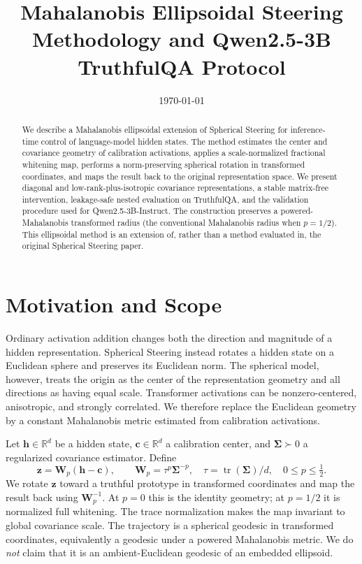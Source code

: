 \documentclass[11pt]{article}
\title{Mahalanobis Ellipsoidal Steering\\
\large Methodology and Qwen2.5-3B TruthfulQA Protocol}
\author{}
\date{\today}
\newcommand{\R}{\mathbb{R}}
\begin{document}
\maketitle

\begin{abstract}
We describe a Mahalanobis ellipsoidal extension of Spherical Steering for
inference-time control of language-model hidden states.  The method estimates
the center and covariance geometry of calibration activations, applies a
scale-normalized fractional whitening map, performs a norm-preserving
spherical rotation in transformed coordinates, and maps the result back to
the original representation space. We present
diagonal and low-rank-plus-isotropic covariance representations, a stable
matrix-free intervention, leakage-safe nested evaluation on TruthfulQA, and
the validation procedure used for Qwen2.5-3B-Instruct. The construction
preserves a powered-Mahalanobis transformed radius (the conventional
Mahalanobis radius when $p=1/2$). This ellipsoidal method
is an extension of, rather than a method evaluated in, the original Spherical
Steering paper.
\end{abstract}

\section{Motivation and Scope}

Ordinary activation addition changes both the direction and magnitude of a
hidden representation.  Spherical Steering instead rotates a hidden state on
a Euclidean sphere and preserves its Euclidean norm.  The spherical model,
however, treats the origin as the center of the representation geometry and
all directions as having equal scale.  Transformer activations can be
nonzero-centered, anisotropic, and strongly correlated.  We therefore replace
the Euclidean geometry by a constant Mahalanobis metric estimated from
calibration activations.

Let $\bm h\in\R^d$ be a hidden state, $\bm c\in\R^d$ a calibration center, and
$\bm\Sigma\succ0$ a regularized covariance estimator.  Define
\begin{equation}
  \bm z = \bm W_p(\bm h-\bm c),
  \qquad \bm W_p=\tau^p\bm\Sigma^{-p},\quad
  \tau=\operatorname{tr}(\bm\Sigma)/d,\quad 0\leq p\leq\tfrac12.
\end{equation}
We rotate $\bm z$ toward a truthful prototype in transformed coordinates and map
the result back using $\bm W_p^{-1}$. At $p=0$ this is the identity geometry;
at $p=1/2$ it is normalized full whitening. The trace normalization makes the
map invariant to global covariance scale. The trajectory is a spherical geodesic in
transformed coordinates, equivalently a geodesic under a powered Mahalanobis
metric.  We do \emph{not} claim that it is an ambient-Euclidean geodesic of an
embedded ellipsoid.
\end{document}

